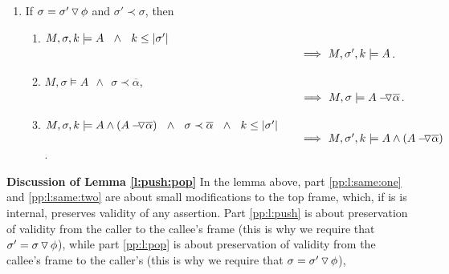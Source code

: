 {\begin{lemma}
\begin{enumerate}
\begin{enumerate}
 
\item 
\label{pp:l:three}
$M, \sigma \models    {\PushAS   {\alpha} {A}} \ \ \wedge\ \  Rng(\phi)=\overline {\alpha}$ \\
$\strut \hspace{8cm} \Longrightarrow\  M,  {\sigma'} \models   A $.

\item
\label{pp:l:five}
$\satDAssertFrom M  \sigma k     {A \wedge ( \PushAS   {\alpha} {A})} \ \ \wedge\ \  Rng(\phi)=\overline {\alpha}$ \\
$\strut \hspace{8cm} \Longrightarrow\   \satDAssertFrom M  {\sigma'} k   {A \wedge( \PushAS   {\alpha} {A})}  $.
\end{enumerate}


\item
\label{pp:l:pop}
If $\sigma=\sigma'  \, {\triangledown}\, \phi$ and $ \sigma' \prec \sigma$, then
\begin{enumerate}

\item
\label{pp:l:two}
$M,\sigma ,{k} \models {A}   \ \  \wedge\ \ k \leq |\sigma'|$ \\
$\strut \hspace{8cm} \Longrightarrow\  \satDAssertFrom M  {\sigma'} k   A  $.
 
\item
\label{pp:l:four}
$M, \sigma  \models A  \ \  %
\wedge\ \      \sigma \prec {\overline \alpha}$,\\
$\strut \hspace{8cm} \Longrightarrow \  
M, \sigma  \models {\PushAS   {\alpha} {A}}$.

\item
 \label{pp:l:six}
$M,\sigma ,{k} \models {A \wedge ( \ensuremath{ {A} -\!\!\!\,\!{\triangledown} \overline{\alpha} })}  \ \ \wedge\ \  \sigma \prec {\overline {\alpha}}
 \ \  \wedge\ \ k \leq |\sigma'| \ \ $ \\
$\strut \hspace{8cm} \Longrightarrow \  \satDAssertFrom M  {\sigma'} k   {A \wedge( \PushAS   {\alpha} {A})}  $.

\end{enumerate}

\end{enumerate}
\end{lemma}
 
 \noindent
\vspace{.1cm}
{\textbf{Discussion of Lemma \ref{l:push:pop}}} 
 In the lemma above, part \ref{pp:l:same:one}  and  \ref{pp:l:same:two} are
 about small modifications to the top frame, which, if is is internal, preserves validity of any assertion.
 Part \ref{pp:l:push} is about preservation of validity from the caller to the  callee's frame (this is why we require that $\sigma'=\sigma  \, {\triangledown}\, \phi$),
 while part \ref{pp:l:pop} is about preservation of validity from the callee's frame to the caller's (this is why we require that $\sigma=\sigma'  \, {\triangledown}\, \phi$),
 
}
